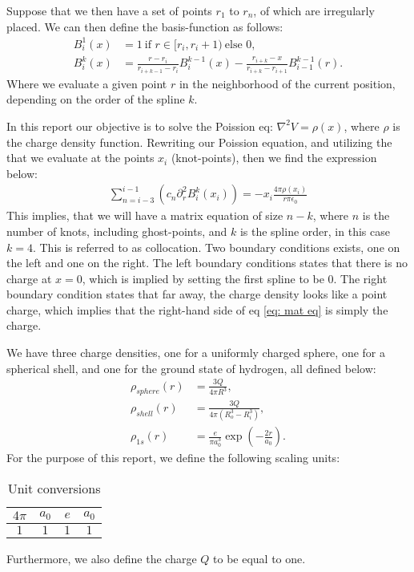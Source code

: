 \documentclass[a4paper]{article}
\newcommand{\newparagraph}{\vspace{.5cm}\noindent}
\begin{document}
\newparagraph
Suppose that we then have a set of points $r_1$ to $r_n$, of which are irregularly placed. We can then define the basis-function as follows:
\begin{align}
    B_i^1(x) &= 1~\text{if } r\in[r_i, r_i + 1) ~\text{else }0,\\
    B_i^k(x) &= \frac{r - r_i}{r_{i + k - 1} - r_{i}}B_i^{k - 1}(x) - \frac{r_{i + k} - x}{r_{i + k} - r_{i + 1}}B_{i - 1}^{k - 1}(r).
\end{align}Where we evaluate a given point $r$ in the neighborhood of the current position, depending on the order of the spline $k$.

\newparagraph
In this report our objective is to solve the Poission eq: $\nabla^2V = \rho(x)$, where $\rho$ is the charge density function.
Rewriting our Poission equation, and utilizing the that we evaluate at the points $x_i$ (knot-points), then we find the expression below:
\begin{align}
    \sum_{n = i - 3}^{i - 1} \left(c_n \partial_r^2 B_{i}^k(x_i)\right) = -x_i \frac{4\pi\rho(x_i)}{r\pi \epsilon_0}\label{eq: mat eq}
\end{align}This implies, that we will have a matrix equation of size $n - k$, where $n$ is the number of knots, including ghost-points, and $k$ is the spline order, in this case $k = 4$. This is referred to as collocation.
Two boundary conditions exists, one on the left and one on the right.
The left boundary conditions states that there is no charge at $x = 0$, which is implied by setting the first spline to be $0$.
The right boundary condition states that far away, the charge density looks like a point charge, which implies that the right-hand side of eq \eqref{eq: mat eq} is simply the charge.

\newparagraph
We have three charge densities, one for a uniformly charged sphere, one for a spherical shell, and one for the ground state of hydrogen, all defined below:
\begin{align}
    \rho_{sphere}(r) &= \frac{3Q}{4\pi R^3},\label{eq: uniform sphere}\\
    \rho_{shell}(r) &= \frac{3Q}{4\pi \left(R_o^3 - R_i^3\right)},\label{eq: shell}\\
    \rho_{1s}(r) &= \frac{e}{\pi a_0^3}\exp\left(-\frac{2r}{a_0}\right)\label{eq: 1s hydrogen}.
\end{align}For the purpose of this report, we define the following scaling units:
\begin{table}[H]
    \centering
    \caption{Unit conversions}
    \begin{tabular}{|c|c|c|c|}\hline
        $4\pi$ & $a_0$ & $e$ & $a_0$\\\hline
        $1$ & $1$ & $1$ & $1$\\\hline
    \end{tabular}
\end{table}\noindent
Furthermore, we also define the charge $Q$ to be equal to one.
\end{document}
